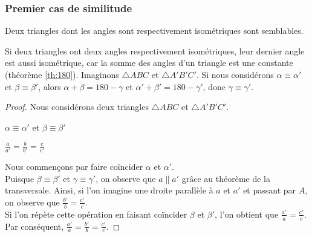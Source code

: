 \documentclass[a4paper,12pt]{article}
\begin{document}
\subsubsection{Premier cas de similitude}
\begin{theorem}
Deux triangles dont les angles sont respectivement isométriques sont semblables.
\end{theorem}

\begin{remark}
Si deux triangles ont deux angles respectivement isométriques, leur dernier angle est aussi isométrique, car la somme des angles d'un triangle est une constante (théorème \ref{th:180}). Imaginons $\triangle ABC$ et $\triangle A'B'C'$. Si nous considérons $\alpha \equiv \alpha'$ et $\beta \equiv \beta'$, alors $\alpha + \beta = 180 - \gamma$ et $\alpha' + \beta' = 180 - \gamma'$, donc $\gamma \equiv \gamma'$.

\end{remark}


\begin{proof}
Nous considérons deux triangles $\triangle ABC$ et $\triangle A'B'C'$.

\begin{hyp}
$\alpha \equiv \alpha'$ et $\beta \equiv \beta'$
\end{hyp}

\begin{concl}
$\frac{a}{a'} = \frac{b}{b'} = \frac{c}{c'}$
\end{concl}

Nous commençons par faire coïncider $\alpha$ et $\alpha '$.\\

Puisque $\beta \equiv \beta '$ et $\gamma \equiv \gamma '$, on observe que $a \parallel a'$ grâce au théorème de la transversale.
Ainsi, si l'on imagine une droite parallèle à $a$ et $a'$ et passant par $A$, on observe que $\frac{b'}{b} = \frac{c'}{c}$.\\
Si l'on répète cette opération en faisant coïncider $\beta$ et $\beta '$, l'on obtient que $\frac{a'}{a} = \frac{c'}{c}$.\\
Par conséquent, $\frac{a'}{a} = \frac{b'}{b} = \frac{c'}{c}$.


\end{proof}
\end{document}
